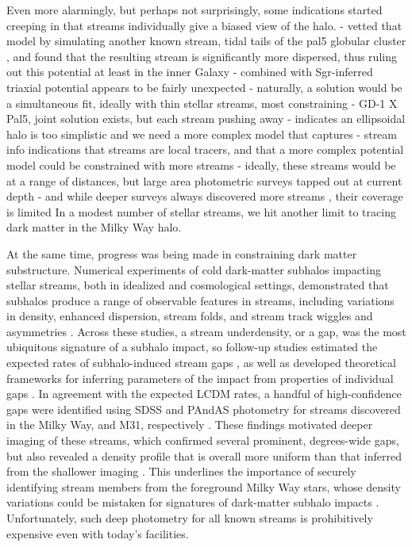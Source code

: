 \documentclass[final,5p,times,twocolumn,authoryear]{elsarticle}
\begin{document}
Even more alarmingly, but perhaps not surprisingly, some indications started creeping in that streams individually give a biased view of the halo.
- \citet{pearson} vetted that model by simulating another known stream, tidal tails of the pal5 globular cluster \citep{odenkirchen, rockosi}, and found that the resulting stream is significantly more dispersed, thus ruling out this potential at least in the inner Galaxy
- combined with Sgr-inferred triaxial potential appears to be fairly unexpected \citep{debattista}
- naturally, a solution would be a simultaneous fit, ideally with thin stellar streams, most constraining \citep{lux}
- GD-1 X Pal5, joint solution exists, but each stream pushing away \citep{bovy}
- indicates an ellipsoidal halo is too simplistic and we need a more complex model that captures \citep{halo_shapes, lowing}
- stream info indications that streams are local tracers, and that a more complex potential model could be constrained with more streams \citep{bh:2018}
- ideally, these streams would be at a range of distances, but large area photometric surveys tapped out at current depth
- and while deeper surveys always discovered more streams \citep{pandas, des}, their coverage is limited
In a modest number of stellar streams, we hit another limit to tracing dark matter in the Milky Way halo.

At the same time, progress was being made in constraining dark matter substructure.
Numerical experiments of cold dark-matter subhalos impacting stellar streams, both in idealized and cosmological settings, demonstrated that subhalos produce a range of observable features in streams, including variations in density, enhanced dispersion, stream folds, and stream track wiggles and asymmetries \citep{carlberg:2009, yoon:2011, ngan:2015, ngan:2016, sandford:2017}.
Across these studies, a stream underdensity, or a gap, was the most ubiquitous signature of a subhalo impact, so follow-up studies estimated the expected rates of subhalo-induced stream gaps \citep{carlberg:2012b, ngan:2014, erkal:2016, banik:2018}, as well as developed theoretical frameworks for inferring parameters of the impact from properties of individual gaps \citep{carlberg:2013b, erkal:2015a, erkal:2015b, helmi:2016, sanders:2016, koppelman:2021}.
In agreement with the expected LCDM rates, a handful of high-confidence gaps were identified using SDSS and PAndAS photometry for streams discovered in the Milky Way, and M31, respectively \citep{carlberg:2011, carlberg:2012, carlberg:2013, carlberg:2016b, carlberg:2016}.
These findings motivated deeper imaging of these streams, which confirmed several prominent, degrees-wide gaps, but also revealed a density profile that is overall more uniform than that inferred from the shallower imaging \citep{ibata:2016, erkal:2017, bovy:2017, deboer:2018, bonaca:2020}.
This underlines the importance of securely identifying stream members from the foreground Milky Way stars, whose density variations could be mistaken for signatures of dark-matter subhalo impacts \citep{thomas:2016}.
Unfortunately, such deep photometry for all known streams is prohibitively expensive even with today's facilities.
\end{document}
